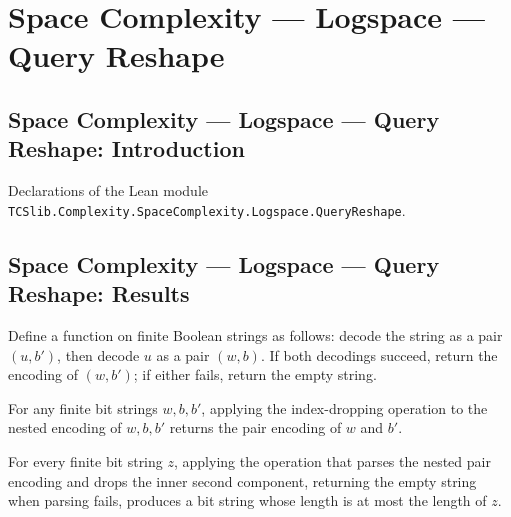 \section{Space Complexity --- Logspace --- Query Reshape}
\subsection*{Space Complexity --- Logspace --- Query Reshape: Introduction}

Declarations of the Lean module \texttt{TCSlib.Complexity.SpaceComplexity.Logspace.QueryReshape}.

\subsection*{Space Complexity --- Logspace --- Query Reshape: Results}

\begin{definition}
\label{Complexity.dropIdx}
\leanok
{}
Define a function on finite Boolean strings as follows: decode the string as a pair
$(u,b')$, then decode $u$ as a pair $(w,b)$. If both decodings succeed, return the
encoding of $(w,b')$; if either fails, return the empty string.
\end{definition}

\begin{theorem}
\label{Complexity.dropIdx_pairEncode}
\leanok
{}
For any finite bit strings $w,b,b'$, applying the index-dropping operation to the nested
encoding of $w,b,b'$ returns the pair encoding of $w$ and $b'$.
\end{theorem}

\begin{theorem}
\label{Complexity.dropIdx_length_le}
\leanok
{}
For every finite bit string $z$, applying the operation that parses the nested pair
encoding and drops the inner second component, returning the empty string when parsing
fails, produces a bit string whose length is at most the length of $z$.
\end{theorem}

